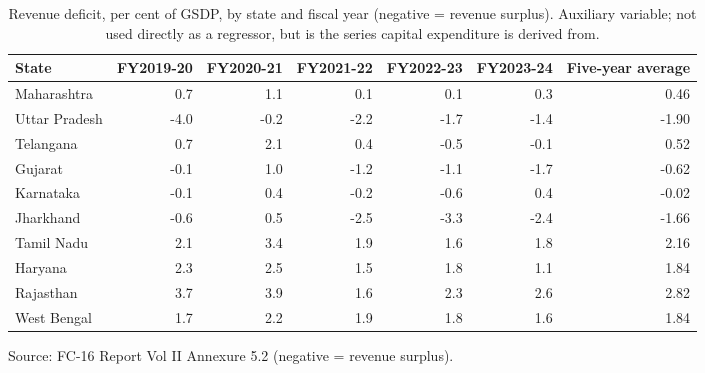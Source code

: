 \documentclass[12pt,a4paper]{article}
\begin{document}
\begin{table}[H]
\centering
\caption{Revenue deficit, per cent of GSDP, by state and fiscal year (negative = revenue surplus). Auxiliary variable; not used directly as a regressor, but is the series capital expenditure is derived from.}
\label{tab:10}
\footnotesize
\begin{adjustbox}{max width=\textwidth}
\begin{tabular}{@{}lrrrrrr@{}}
\toprule
State & FY2019-20 & FY2020-21 & FY2021-22 & FY2022-23 & FY2023-24 & Five-year average \\
\midrule
Maharashtra & 0.7 & 1.1 & 0.1 & 0.1 & 0.3 & 0.46 \\
Uttar Pradesh & -4.0 & -0.2 & -2.2 & -1.7 & -1.4 & -1.90 \\
Telangana & 0.7 & 2.1 & 0.4 & -0.5 & -0.1 & 0.52 \\
Gujarat & -0.1 & 1.0 & -1.2 & -1.1 & -1.7 & -0.62 \\
Karnataka & -0.1 & 0.4 & -0.2 & -0.6 & 0.4 & -0.02 \\
Jharkhand & -0.6 & 0.5 & -2.5 & -3.3 & -2.4 & -1.66 \\
Tamil Nadu & 2.1 & 3.4 & 1.9 & 1.6 & 1.8 & 2.16 \\
Haryana & 2.3 & 2.5 & 1.5 & 1.8 & 1.1 & 1.84 \\
Rajasthan & 3.7 & 3.9 & 1.6 & 2.3 & 2.6 & 2.82 \\
West Bengal & 1.7 & 2.2 & 1.9 & 1.8 & 1.6 & 1.84 \\
\bottomrule
\end{tabular}
\end{adjustbox}
\end{table}

Source: FC-16 Report Vol II Annexure 5.2 (negative = revenue surplus).
\end{document}
